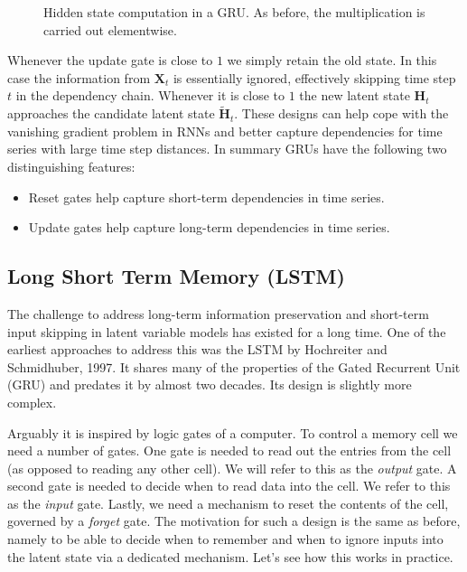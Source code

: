 \begin{figure}[hpt]
	\centering
	
	\caption{Hidden state computation in a GRU. As before, the multiplication is carried out elementwise.}
	\label{fig:gru_3}
\end{figure}

Whenever the update gate is close to $1$ we simply retain the old state. In this case the information from $\mathbf{X}_t$ is essentially ignored, effectively skipping time step $t$ in the dependency chain. Whenever it is close to $1$ the new latent state $\mathbf{H}_t$ approaches the candidate latent state $\tilde{\mathbf{H}}_t$. These designs can help cope with the vanishing gradient problem in RNNs and better capture dependencies for time series with large time step distances. In summary GRUs have the following two distinguishing features:

\begin{itemize}
    \item Reset gates help capture short-term dependencies in time series.
    \item Update gates help capture long-term dependencies in time series.
\end{itemize}

\subsection{Long Short Term Memory (LSTM)}\label{subsec:lstm}

The challenge to address long-term information preservation and short-term input skipping in latent variable models has existed for a long time. One of the earliest approaches to address this was the LSTM by Hochreiter and Schmidhuber, 1997. It shares many of the properties of the Gated Recurrent Unit (GRU) and predates it by almost two decades. Its design is slightly more complex.

Arguably it is inspired by logic gates of a computer. To control a memory cell we need a number of gates. One gate is needed to read out the entries from the cell (as opposed to reading any other cell). We will refer to this as the \textit{output} gate. A second gate is needed to decide when to read data into the cell. We refer to this as the \textit{input} gate. Lastly, we need a mechanism to reset the contents of the cell, governed by a \textit{forget} gate. The motivation for such a design is the same as before, namely to be able to decide when to remember and when to ignore inputs into the latent state via a dedicated mechanism. Let’s see how this works in practice.

